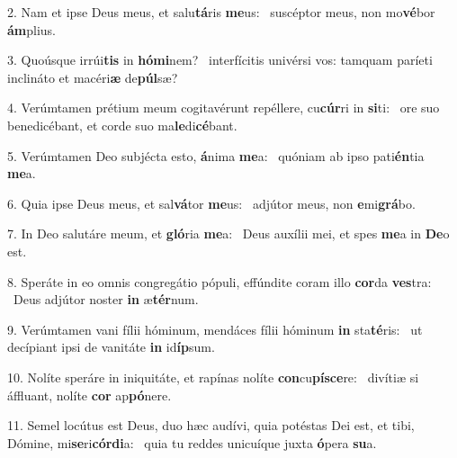 2. Nam et ipse Deus meus, et salu\textbf{tá}ris \textbf{me}us: \ast\  suscéptor meus, non mo\textbf{vé}bor \textbf{ám}plius.\

3. Quoúsque irrúi\textbf{tis} in \textbf{hó}\textbf{mi}nem? \ast\  interfícitis univérsi vos: tamquam paríeti inclináto et macéri\textbf{æ} de\textbf{púl}sæ?\

4. Verúmtamen prétium meum cogitavérunt repéllere, cu\textbf{cúr}ri in \textbf{si}ti: \ast\  ore suo benedicébant, et corde suo ma\textbf{le}di\textbf{cé}bant.\

5. Verúmtamen Deo subjécta esto, \textbf{á}nima \textbf{me}a: \ast\  quóniam ab ipso pati\textbf{én}tia \textbf{me}a.\

6. Quia ipse Deus meus, et sal\textbf{vá}tor \textbf{me}us: \ast\  adjútor meus, non \textbf{e}mi\textbf{grá}bo.\

7. In Deo salutáre meum, et \textbf{gló}ria \textbf{me}a: \ast\  Deus auxílii mei, et spes \textbf{me}a in \textbf{De}o est.\

8. Speráte in eo omnis congregátio pópuli, effúndite coram illo \textbf{cor}da \textbf{ves}tra: \ast\  Deus adjútor noster \textbf{in} æ\textbf{tér}num.\

9. Verúmtamen vani fílii hóminum, mendáces fílii hóminum \textbf{in} sta\textbf{té}ris: \ast\  ut decípiant ipsi de vanitáte \textbf{in} id\textbf{íp}sum.\

10. Nolíte speráre in iniquitáte, et rapínas nolíte \textbf{con}cu\textbf{pí}\textbf{sce}re: \ast\  divítiæ si áffluant, nolíte \textbf{cor} ap\textbf{pó}nere.\

11. Semel locútus est Deus, duo hæc audívi, quia potéstas Dei est, et tibi, Dómine, mi\textbf{se}ri\textbf{cór}\textbf{di}a: \ast\  quia tu reddes unicuíque juxta \textbf{ó}pera \textbf{su}a.\

